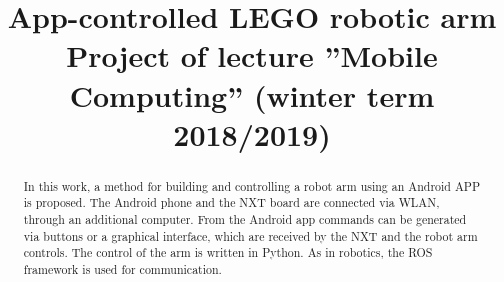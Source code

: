 \documentclass[conference]{IEEEtran}
\begin{document}
\title{App-controlled LEGO robotic arm\\
{\footnotesize Project of lecture ''Mobile Computing'' (winter term 2018/2019)}
}

\author{
\and
{}
}

\maketitle

\begin{abstract}
In this work, a method for building and controlling a robot arm using an Android APP is proposed. The Android phone and the NXT board are connected via WLAN, through an additional computer. From the Android app commands can be generated via buttons or a graphical interface, which are received by the NXT and the robot arm controls. The control of the arm is written in Python. As in robotics, the ROS framework is used for communication.
\end{abstract}

\end{document}
